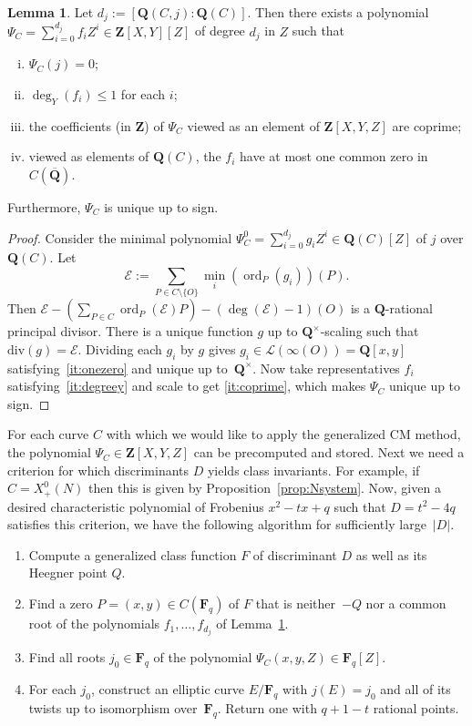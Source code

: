 \documentclass{amsart}
\newcommand{\QQ}{\mathbf{Q}}
\newcommand{\ZZ}{\mathbf{Z}}
\newcommand{\FF}{\mathbf{F}}
\newcommand{\calL}{\mathcal{L}}
\renewcommand{\div}{\mathrm{div}}
\newcommand{\mc}{\mathcal}
\newcommand{\xplus}[1]{X^0_+(#1)}
\newcommand{\xplusN}{\xplus{N}}
\DeclareMathOperator{\ord}{ord}
\numberwithin{equation}{section}
\theoremstyle{definition}
\newtheorem{lemma}[equation]{Lemma}
\begin{document}
\begin{lemma}\label{lem:modularpolynomials} 
Let $d_j:=[\QQ(C,j):\QQ(C)]$. Then there exists a polynomial
$\Psi_C=\sum_{i=0}^{d_j} f_iZ^i\in \ZZ[X,Y][Z]$
of degree $d_j$ in $Z$ such that
\begin{enumerate}[(i)]
\item $\Psi_C(j)=0$;
\item \label{it:degreey} $\deg_{Y}(f_i) \leq 1$ for each $i$;
\item \label{it:coprime} the coefficients (in $\ZZ$) of $\Psi_C$ viewed as an element of $\ZZ[X,Y,Z]$ are coprime;
\item \label{it:onezero} viewed as elements of $\QQ(C)$, the $f_i$ have at most one common zero in $C(\overline{\QQ})$.
\end{enumerate}
Furthermore, $\Psi_C$ is unique up to sign.
\end{lemma}
\begin{proof}
Consider the minimal polynomial 
$\Psi_C^0 = \sum_{i=0}^{d_j} g_iZ^i\in \QQ(C)[Z]$
of $j$ over $\QQ(C)$.
Let
\begin{equation*}
\mc{E}:=\sum_{P\in C\setminus\{O\}} \min_i(\ord_P(g_i))(P).
\end{equation*}
Then $\mc{E} - \left(\sum_{P\in C}\ord_P(\mc{E})P\right) - (\deg(\mc{E})-1)(O)$ is a
$\QQ$-rational principal divisor.
There is a unique function $g$ up to $\QQ^\times$-scaling
such that $\div(g)=\mc{E}$.
Dividing each $g_i$ by $g$ gives $g_i\in \calL(\infty(O)) = \QQ[x,y]$
satisfying~\eqref{it:onezero}
and unique up to~$\QQ^\times$.
Now take representatives $f_i$ satisfying~\eqref{it:degreey}
and scale to get \eqref{it:coprime},
which makes $\Psi_C$ unique up to sign.
\end{proof}
For each curve $C$ with which we would like to apply the
generalized CM method, the polynomial
$\Psi_C\in\ZZ[X,Y,Z]$ can be precomputed and stored.
Next we need a criterion for which discriminants $D$ yields class invariants.
For example, if $C=\xplusN$ then this is given by Proposition~\ref{prop:Nsystem}.
Now, given a desired characteristic polynomial of Frobenius $x^2-tx+q$ such that $D=t^2-4q$ satisfies this criterion, we have the following algorithm for sufficiently large~$|D|$.

\begin{enumerate}
\item[(1)]\label{it:computeF} Compute a generalized class function $F$
of discriminant $D$ as well as its Heegner point $Q$.
\item[(2a)] 
Find a zero $P=(x,y)\in C(\FF_q)$ of $F$ that is 
neither~$-Q$ nor a common root of the polynomials
$f_1,\ldots, f_{d_j}$ of Lemma~\ref{lem:modularpolynomials}.
\item[(2b)] Find all roots $j_0\in\FF_q$ of the polynomial $\Psi_C(x,y,Z)\in\FF_q[Z]$.
\item[(3)] For each $j_0$,
construct an elliptic curve $E/\FF_q$ with $j(E)=j_0$
and all of its twists up to isomorphism over~$\FF_q$.
Return one with $q+1-t$ rational points.
\end{enumerate}
\end{document}
